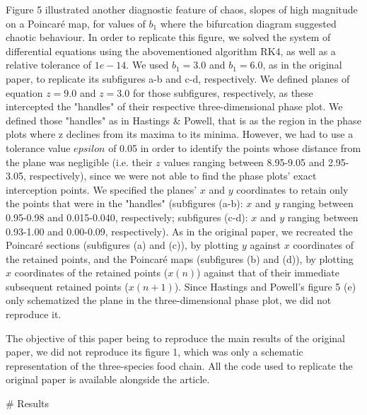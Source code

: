 Figure 5 illustrated another diagnostic feature of chaos, slopes of high magnitude on a
Poincaré map, for values of $b_1$ where the bifurcation diagram suggested chaotic
behaviour. In order to replicate this figure, we solved the system of differential
equations using the abovementioned algorithm RK4, as well as a relative tolerance of
$1e-14$. We used $b_1 = 3.0$ and $b_1 = 6.0$, as in the original paper, to replicate its
subfigures a-b and c-d, respectively.
We defined planes of equation $z = 9.0$ and $z = 3.0$ for those subfigures, respectively,
as these intercepted the "handles" of their respective three-dimensional phase plot.
We defined those "handles" as in Hastings & Powell, that is as the region in the phase
plots where z declines from its maxima to its minima.
However, we had to use a tolerance value $epsilon$ of 0.05 in order to identify the points
whose distance from the plane was negligible (i.e. their $z$ values ranging between
8.95-9.05 and 2.95-3.05, respectively), since we were not able to find the phase plots'
exact interception points.
We specified the planes' $x$ and $y$ coordinates to retain only the points that were in
the "handles" (subfigures (a-b): $x$ and $y$ ranging between 0.95-0.98 and 0.015-0.040,
respectively; subfigures (c-d): $x$ and $y$ ranging between 0.93-1.00 and 0.00-0.09,
respectively).
As in the original paper, we recreated the Poincaré sections (subfigures (a) and (c)), by
plotting $y$ against $x$ coordinates of the retained points, and the Poincaré maps
(subfigures (b) and (d)), by plotting $x$ coordinates of the retained points ($x(n)$)
against that of their immediate subsequent retained points ($x(n+1)$). Since Hastings and
Powell's figure 5 (e) only schematized the plane in the three-dimensional phase plot, we
did not reproduce it.

The objective of this paper being to reproduce the main results of the original paper, we
did not reproduce its figure 1, which was only a schematic representation of the
three-species food chain.
All the code used to replicate the original paper is available alongside the article.

# Results

